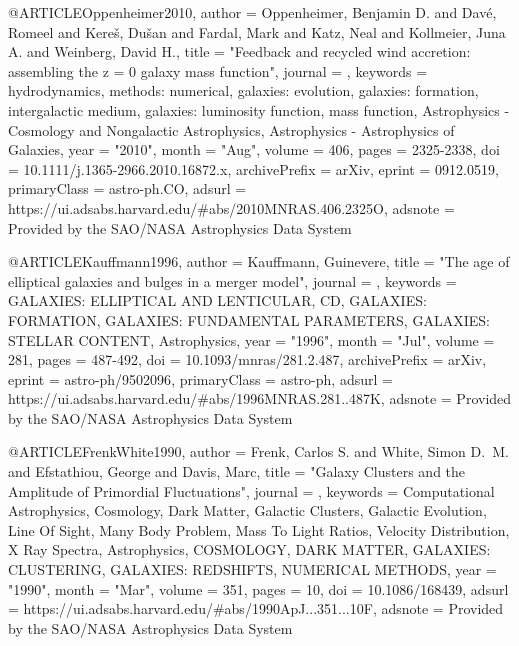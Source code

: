 {@ARTICLE{Oppenheimer2010,
       author = {{Oppenheimer}, Benjamin D. and {Dav{\'e}}, Romeel and
         {Kere{\v{s}}}, Du{\v{s}}an and {Fardal}, Mark and {Katz}, Neal and
         {Kollmeier}, Juna A. and {Weinberg}, David H.},
        title = "{Feedback and recycled wind accretion: assembling the z = 0 galaxy mass function}",
      journal = {\mnras},
     keywords = {hydrodynamics, methods: numerical, galaxies: evolution, galaxies: formation, intergalactic medium, galaxies: luminosity function, mass function, Astrophysics - Cosmology and Nongalactic Astrophysics, Astrophysics - Astrophysics of Galaxies},
         year = "2010",
        month = "Aug",
       volume = {406},
        pages = {2325-2338},
          doi = {10.1111/j.1365-2966.2010.16872.x},
archivePrefix = {arXiv},
       eprint = {0912.0519},
 primaryClass = {astro-ph.CO},
       adsurl = {https://ui.adsabs.harvard.edu/\#abs/2010MNRAS.406.2325O},
      adsnote = {Provided by the SAO/NASA Astrophysics Data System}
}

@ARTICLE{Kauffmann1996,
       author = {{Kauffmann}, Guinevere},
        title = "{The age of elliptical galaxies and bulges in a merger model}",
      journal = {\mnras},
     keywords = {GALAXIES: ELLIPTICAL AND LENTICULAR, CD, GALAXIES: FORMATION, GALAXIES: FUNDAMENTAL PARAMETERS, GALAXIES: STELLAR CONTENT, Astrophysics},
         year = "1996",
        month = "Jul",
       volume = {281},
        pages = {487-492},
          doi = {10.1093/mnras/281.2.487},
archivePrefix = {arXiv},
       eprint = {astro-ph/9502096},
 primaryClass = {astro-ph},
       adsurl = {https://ui.adsabs.harvard.edu/\#abs/1996MNRAS.281..487K},
      adsnote = {Provided by the SAO/NASA Astrophysics Data System}
}

@ARTICLE{FrenkWhite1990,
       author = {{Frenk}, Carlos S. and {White}, Simon D.~M. and {Efstathiou}, George and
         {Davis}, Marc},
        title = "{Galaxy Clusters and the Amplitude of Primordial Fluctuations}",
      journal = {\apj},
     keywords = {Computational Astrophysics, Cosmology, Dark Matter, Galactic Clusters, Galactic Evolution, Line Of Sight, Many Body Problem, Mass To Light Ratios, Velocity Distribution, X Ray Spectra, Astrophysics, COSMOLOGY, DARK MATTER, GALAXIES: CLUSTERING, GALAXIES: REDSHIFTS, NUMERICAL METHODS},
         year = "1990",
        month = "Mar",
       volume = {351},
        pages = {10},
          doi = {10.1086/168439},
       adsurl = {https://ui.adsabs.harvard.edu/\#abs/1990ApJ...351...10F},
      adsnote = {Provided by the SAO/NASA Astrophysics Data System}
}

}
